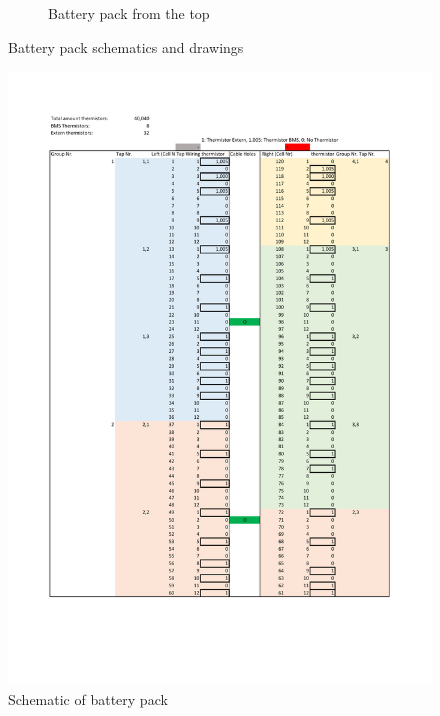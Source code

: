 \begin{figure}[H]
    \begin{subfigure}[b]{0.8\textwidth}
        \centering
        \caption{Battery pack from the top}
        \label{img: Battery pack from the top}
    \end{subfigure}
    \caption{Battery pack schematics and drawings}
    \label{img: Battery pack schematics}
\end{figure}

\begin{figure}[H]
    \centering
    \includegraphics[width=\textwidth]{texfiles/elec/eimg/BatteryCableScheme}
    \caption{Schematic of battery pack}
    \label{img: batterycabling}
\end{figure}
